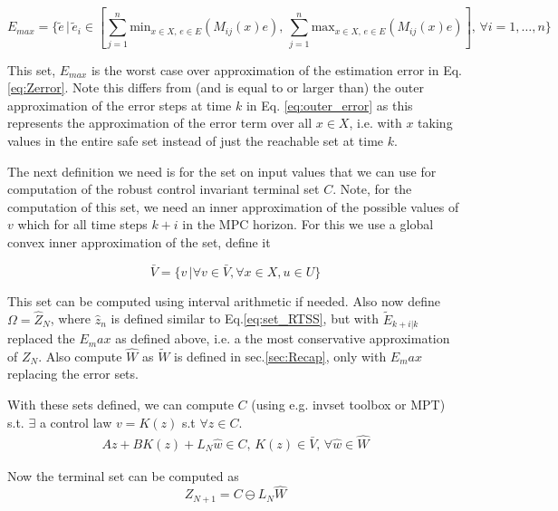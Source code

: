 \documentclass{article}[14pt]
\begin{document}
\begin{equation}
E_{max} = \{\tilde{e}\,|\,\tilde{e}_i\in[\sum_{j=1}^n \text{min}_{x\in X,\,e\in E}(M_{ij}(x)e),\, \sum_{j=1}^n \text{max}_{x\in X,\,e\in E}(M_{ij}(x)e)],\,\forall i=1,\dotsc,n\}
\end{equation}

This set, $E_{max}$ is the worst case over approximation of the estimation error in Eq.\ref{eq:Zerror}. Note this differs from (and is equal to or larger than) the outer approximation of the error steps at time $k$ in Eq. \ref{eq:outer_error} as this represents the approximation of the error term over all $x\in X$, i.e. with $x$ taking values in the entire safe set instead of just the reachable set at time $k$.

The next definition we need is for the set on input values that we can use for computation of the robust control invariant terminal set $C$. Note, for the computation of this set, we need an inner approximation of the possible values of $v$ which for all time steps $k+i$ in the MPC horizon. For this we use a global convex inner approximation of the set, define it

\begin{equation}
\bar{V} = \{v\,|\forall v\in \bar{V},\forall x\in X, u\in U\}
\end{equation}

This set can be computed using interval arithmetic if needed. Also now define $\Omega=\hat{Z}_N$, where $\hat{z}_n$ is defined similar to Eq.\ref{eq:set_RTSS}, but with $\tilde{E}_{k+i|k}$ replaced the $E_max$ as defined above, i.e. a the most conservative approximation of $Z_N$. Also compute $\hat{W}$ as $\tilde{W}$ is defined in sec.\ref{sec:Recap}, only with $E_max$ replacing the error sets.

With these sets defined, we can compute $C$ (using e.g. invset toolbox or MPT) s.t. $\exists$ a control law $v=K(z)$ s.t $\forall z \in C$.
\begin{subequations}
\begin{align}
Az+BK(z)+L_N\hat{w}\in C,\, K(z)\in \bar{V}, \,\forall \hat{w} \in \hat{W}
\end{align}
\end{subequations}

Now the terminal set can be computed as 
\begin{equation}
Z_{N+1}=C\ominus L_N\hat{W}
\end{equation}
\end{document}
